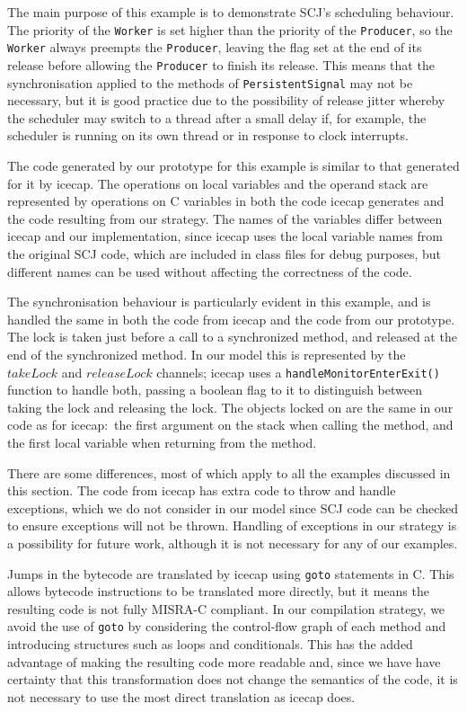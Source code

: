 The main purpose of this example is to demonstrate SCJ's scheduling
behaviour.
The priority of the \texttt{Worker} is set higher than the priority of
the \texttt{Producer}, so the \texttt{Worker} always preempts the
\texttt{Producer}, leaving the flag set at the end of its release
before allowing the \texttt{Producer} to finish its release.
This means that the synchronisation applied to the methods of
\texttt{PersistentSignal} may not be necessary, but it is good
practice due to the possibility of release jitter whereby the
scheduler may switch to a thread after a small delay if, for example,
the scheduler is running on its own thread or in response to clock
interrupts.

The code generated by our prototype for this example is similar to
that generated for it by icecap.
The operations on local variables and the operand stack are
represented by operations on C variables in both the code icecap
generates and the code resulting from our strategy. 
The names of the variables differ between icecap and our
implementation, since icecap uses the local variable names from the
original SCJ code, which are included in class files for debug
purposes, but different names can be used without affecting the
correctness of the code.

The synchronisation behaviour is particularly evident in this example,
and is handled the same in both the code from icecap and the code from
our prototype.
The lock is taken just before a call to a synchronized method, and
released at the end of the synchronized method.
In our model this is represented by the $takeLock$ and $releaseLock$
channels; icecap uses a \texttt{handleMonitorEnterExit()} function to
handle both, passing a boolean flag to it to distinguish between taking
the lock and releasing the lock.
The objects locked on are the same in our code as for icecap:~the
first argument on the stack when calling the method, and the first
local variable when returning from the method.

There are some differences, most of which apply to all the examples
discussed in this section.
The code from icecap has extra code to throw and handle exceptions,
which we do not consider in our model since SCJ code can be checked to
ensure exceptions will not be thrown.
Handling of exceptions in our strategy is a possibility for future
work, although it is not necessary for any of our examples.

Jumps in the bytecode are translated by icecap using \texttt{goto}
statements in C.
This allows bytecode instructions to be translated more directly, but
it means the resulting code is not fully MISRA-C compliant.
In our compilation strategy, we avoid the use of \texttt{goto} by
considering the control-flow graph of each method and introducing
structures such as loops and conditionals.
This has the added advantage of making the resulting code more
readable and, since we have have certainty that this transformation
does not change the semantics of the code, it is not necessary to use
the most direct translation as icecap does.

